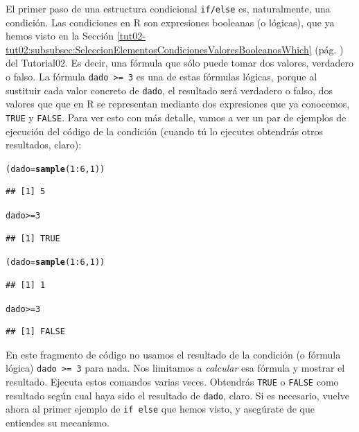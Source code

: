 \documentclass[10pt,a4paper]{article}\usepackage[]{graphicx}\usepackage[]{color}
\makeatletter
\newcommand{\hlnum}[1]{\textcolor[rgb]{0.686,0.059,0.569}{#1}}%
\newcommand{\hlopt}[1]{\textcolor[rgb]{0,0,0}{#1}}%
\newcommand{\hlstd}[1]{\textcolor[rgb]{0.345,0.345,0.345}{#1}}%
\newcommand{\hlkwb}[1]{\textcolor[rgb]{0.69,0.353,0.396}{#1}}%
\newcommand{\hlkwd}[1]{\textcolor[rgb]{0.737,0.353,0.396}{\textbf{#1}}}%
\newenvironment{kframe}{%
 \def\at@end@of@kframe{}%
 \ifinner\ifhmode%
  \def\at@end@of@kframe{\end{minipage}}%
  \begin{minipage}{\columnwidth}%
 \fi\fi%
 \def\FrameCommand##1{\hskip\@totalleftmargin \hskip-\fboxsep
 \colorbox{shadecolor}{##1}\hskip-\fboxsep
     \hskip-\linewidth \hskip-\@totalleftmargin \hskip\columnwidth}%
 \MakeFramed {\advance\hsize-\width
   \@totalleftmargin\z@ \linewidth\hsize
   \@setminipage}}%
 {\par\unskip\endMakeFramed%
 \at@end@of@kframe}
\newenvironment{knitrout}{}{} %
\makeatother
\begin{document}
El primer paso de una estructura condicional {\tt if/else} es, naturalmente, una condición. Las condiciones en R son {\sf expresiones booleanas (o lógicas)}, que ya hemos visto en la Sección \ref{tut02-tut02:subsubsec:SeleccionElementosCondicionesValoresBooleanosWhich}
(pág. \pageref{tut02-tut02:subsubsec:SeleccionElementosCondicionesValoresBooleanosWhich}) del Tutorial02. Es decir, una fórmula que sólo puede tomar dos valores, verdadero o falso.
La fórmula {\tt dado >= 3} es una de estas fórmulas lógicas, porque al sustituir cada valor concreto de {\tt dado}, el resultado será verdadero o falso, dos valores que que en R se representan mediante dos expresiones que ya conocemos, {\tt TRUE} y {\tt FALSE}. Para ver esto con más detalle, vamos a ver un par de ejemplos de ejecución del código de la condición (cuando tú lo ejecutes obtendrás otros resultados, claro):
\begin{knitrout}
\color{fgcolor}\begin{kframe}
\begin{alltt}
    \hlstd{(dado} \hlkwb{=} \hlkwd{sample}\hlstd{(}\hlnum{1}\hlopt{:}\hlnum{6}\hlstd{,}\hlnum{1}\hlstd{))}
\end{alltt}
\begin{verbatim}
## [1] 5
\end{verbatim}
\begin{alltt}
    \hlstd{dado} \hlopt{>=} \hlnum{3}
\end{alltt}
\begin{verbatim}
## [1] TRUE
\end{verbatim}
\begin{alltt}
    \hlstd{(dado} \hlkwb{=} \hlkwd{sample}\hlstd{(}\hlnum{1}\hlopt{:}\hlnum{6}\hlstd{,}\hlnum{1}\hlstd{))}
\end{alltt}
\begin{verbatim}
## [1] 1
\end{verbatim}
\begin{alltt}
    \hlstd{dado} \hlopt{>=} \hlnum{3}
\end{alltt}
\begin{verbatim}
## [1] FALSE
\end{verbatim}
\end{kframe}
\end{knitrout}
En este fragmento de código no usamos el resultado de la condición (o fórmula lógica) {\tt dado >= 3} para nada. Nos limitamos a {\em calcular} esa fórmula y mostrar el resultado. Ejecuta estos comandos varias veces. Obtendrás {\tt TRUE} o {\tt FALSE} como resultado según cual haya sido el resultado de {\tt dado}, claro. Si es necesario, vuelve ahora al primer ejemplo de {\tt if else} que hemos visto, y asegúrate de que entiendes su mecanismo.
\end{document}
